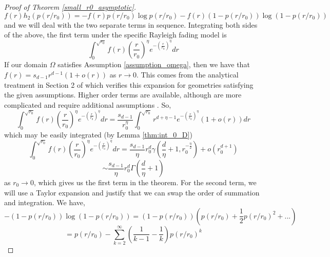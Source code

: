 \documentclass{article}
\newcommand{\ttz}[0]{\rightarrow 0}
\begin{document}
\begin{proof}[Proof of Theorem \ref{small_r0_asymptotic}]
        \begin{equation}
            f(r)h_2(p(r/r_0)) = -f(r)p(r/r_0)\log p(r/r_0) - f(r)(1-p(r/r_0))\log (1-p(r/r_0))
        \end{equation}
        and we will deal with the two separate terms in sequence. Integrating both sides of the above, the first term under the specific Rayleigh fading model is
        \begin{equation}
            \int_0^{\sqrt{r_0}}f(r)\left(\frac{r}{r_0}\right)^{\eta}e^{-\left(\frac{r}{r_0}\right)^\eta}dr
        \end{equation}
        If our domain $\Omega$ satisfies Assumption \ref{assumption_omega}, then we have that $f(r) = s_{d-1}r^{d-1}(1+o(r))$ as $r \ttz$. This comes from the analytical treatment in Section 2 of \cite{guinier1955small} which verifies this expansion for geometries satisfying the given assumptions. Higher order terms are available, although are more complicated and require additional assumptions \cite{ciccariello1995integral}. So,
        \begin{equation}
            \int_0^{\sqrt{r_0}}f(r)\left(\frac{r}{r_0}\right)^{\eta}e^{-\left(\frac{r}{r_0}\right)^\eta}dr = \frac{s_{d-1}}{r_0^{\eta}}\int_0^{\sqrt{r_0}}r^{d+\eta-1}e^{-\left(\frac{r}{r_0}\right)^\eta}(1+o(r))dr
        \end{equation}
        which may be easily integrated (by Lemma \ref{thm:int_0_D})
        \begin{equation}
            \int_0^{\sqrt{r_0}}f(r)\left(\frac{r}{r_0}\right)^{\eta}e^{-\left(\frac{r}{r_0}\right)^\eta}dr = \frac{s_{d-1}}{\eta}r_0^d\gamma\left(\frac{d}{\eta}+1, r_0^{-\frac{\eta}{2}}\right) + o(r_0^{d+1})
        \end{equation}
        \begin{equation}
        \label{term1}
            \sim \frac{s_{d-1}}{\eta}r_0^d\Gamma\left(\frac{d}{\eta}+1\right)
        \end{equation}
        as $r_0 \ttz$, which gives us the first term in the theorem. For the second term, we will use a Taylor expansion and justify that we can swap the order of summation and integration. We have,
        \begin{equation}
            -(1-p(r/r_0))\log (1-p(r/r_0)) = (1-p(r/r_0))(p(r/r_0) + \frac{1}{2}p(r/r_0)^2 + ...)
        \end{equation}
        \begin{equation}
            = p(r/r_0) - \sum_{k=2}^{\infty}\left(\frac{1}{k-1}-\frac{1}{k}\right)p(r/r_0)^k

\end{equation}
\end{proof}
\end{document}
